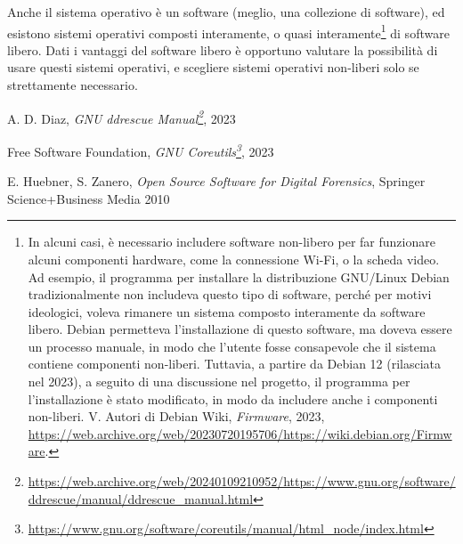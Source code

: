 \documentclass[
  12pt,
  a4paper,
]{book}
\newlength{\cslhangindent}
\newlength{\cslentryspacingunit} %
\newenvironment{CSLReferences}[2] %
 {%
  \setlength{\parindent}{0pt}
  \ifodd #1
  \let\oldpar\par
  \def\par{\hangindent=\cslhangindent\oldpar}
  \fi
  \setlength{\parskip}{#2\cslentryspacingunit}
 }%
 {}
\DeclareRobustCommand{\href}[2]{#2\footnote{\url{#1}}}
\begin{document}
Anche il sistema operativo è un software (meglio, una collezione di
software), ed esistono sistemi operativi composti interamente, o quasi
interamente\footnote{In alcuni casi, è necessario includere software
  non-libero per far funzionare alcuni componenti hardware, come la
  connessione Wi-Fi, o la scheda video. Ad esempio, il programma per
  installare la distribuzione GNU/Linux Debian tradizionalmente non
  includeva questo tipo di software, perché per motivi ideologici,
  voleva rimanere un sistema composto interamente da software libero.
  Debian permetteva l'installazione di questo software, ma doveva essere
  un processo manuale, in modo che l'utente fosse consapevole che il
  sistema contiene componenti non-liberi. Tuttavia, a partire da Debian
  12 (rilasciata nel 2023), a seguito di una discussione nel progetto,
  il programma per l'installazione è stato modificato, in modo da
  includere anche i componenti non-liberi.
  V. {Autori di Debian Wiki}, \emph{Firmware}, {2023}, \url{https://web.archive.org/web/20230720195706/https://wiki.debian.org/Firmware}.}
di software libero. Dati i vantaggi del software libero è opportuno
valutare la possibilità di usare questi sistemi operativi, e scegliere
sistemi operativi non-liberi solo se strettamente necessario.

\hypertarget{refs}{}
\begin{CSLReferences}{0}{0}
\leavevmode{}%
A. D. Diaz,
\emph{\href{https://web.archive.org/web/20240109210952/https://www.gnu.org/software/ddrescue/manual/ddrescue_manual.html}{GNU
ddrescue Manual}}, 2023

\leavevmode{}%
Free Software Foundation,
\emph{\href{https://www.gnu.org/software/coreutils/manual/html_node/index.html}{GNU
Coreutils}}, 2023

\leavevmode{}%
E. Huebner, S. Zanero, \emph{Open Source Software for Digital
Forensics}, Springer Science+Business Media 2010

\end{CSLReferences}

\backmatter
\end{document}
